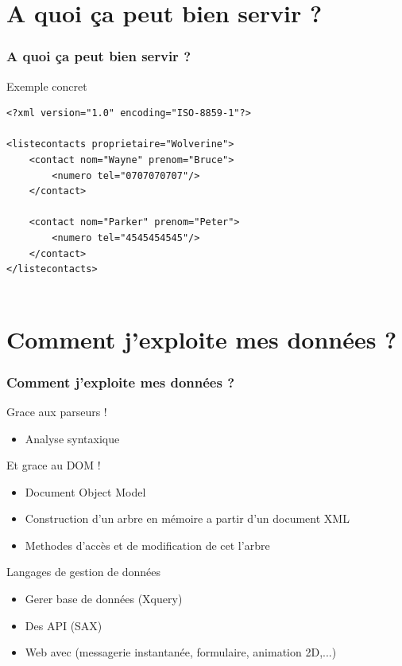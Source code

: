 \documentclass{beamer}
\begin{document}
\section{A quoi ça peut bien servir ?}
\begin{frame}[containsverbatim]
\frametitle{A quoi ça peut bien servir ?}

	\begin{exampleblock}{Exemple concret}
		\begin{Verbatim}[fontsize=\scriptsize]
<?xml version="1.0" encoding="ISO-8859-1"?>

<listecontacts proprietaire="Wolverine"> 
	<contact nom="Wayne" prenom="Bruce"> 
		<numero tel="0707070707"/>
	</contact> 

	<contact nom="Parker" prenom="Peter"> 
		<numero tel="4545454545"/>
	</contact> 
</listecontacts>
			
		\end{Verbatim}
	\end{exampleblock}
\end{frame}

\section{Comment j'exploite mes données ?}
\begin{frame}
\frametitle{Comment j'exploite mes données ?}
\pause
	
	\begin{block}{Grace aux parseurs !}
	\begin{itemize}
	\pause\item Analyse syntaxique
	\end{itemize}
	\end{block}

	\begin{block}{Et grace au DOM !}
	\begin{itemize}
	\pause\item Document Object Model
	\pause\item Construction d'un arbre en mémoire a partir d'un document XML
	\pause\item Methodes d'accès et de modification de cet l'arbre
	\end{itemize}
	\end{block}
	

\end{frame}

\begin{frame}
	
	\begin{block}{Langages de gestion de données}
	\begin{itemize}

	\pause\item Gerer base de données (Xquery)
	\pause\item Des API (SAX)
	\pause\item Web avec (messagerie instantanée, formulaire, animation 2D,...)

	\end{itemize}
	\end{block}
	

\end{frame}
\end{document}
